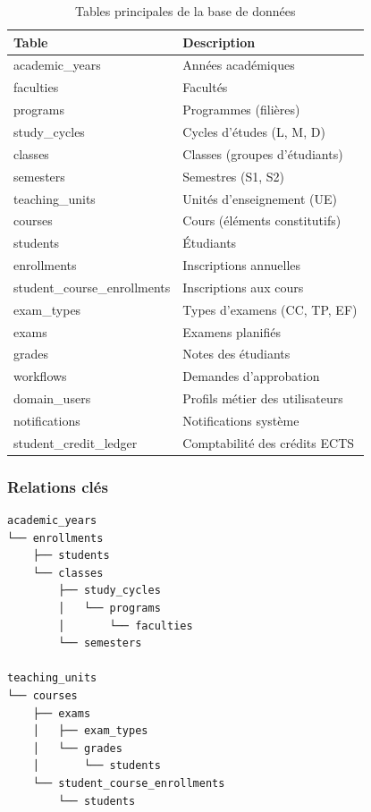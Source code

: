\begin{table}[h]
\centering
\footnotesize
\begin{tabular}{|l|p{8cm}|}
\hline
\textbf{Table} & \textbf{Description} \\
\hline
academic\_years & Années académiques \\
faculties & Facultés \\
programs & Programmes (filières) \\
study\_cycles & Cycles d'études (L, M, D) \\
classes & Classes (groupes d'étudiants) \\
semesters & Semestres (S1, S2) \\
teaching\_units & Unités d'enseignement (UE) \\
courses & Cours (éléments constitutifs) \\
students & Étudiants \\
enrollments & Inscriptions annuelles \\
student\_course\_enrollments & Inscriptions aux cours \\
exam\_types & Types d'examens (CC, TP, EF) \\
exams & Examens planifiés \\
grades & Notes des étudiants \\
workflows & Demandes d'approbation \\
domain\_users & Profils métier des utilisateurs \\
notifications & Notifications système \\
student\_credit\_ledger & Comptabilité des crédits ECTS \\
\hline
\end{tabular}
\caption{Tables principales de la base de données}
\end{table}

\subsubsection{Relations clés}

\begin{verbatim}
academic_years
└── enrollments
    ├── students
    └── classes
        ├── study_cycles
        │   └── programs
        │       └── faculties
        └── semesters

teaching_units
└── courses
    ├── exams
    │   ├── exam_types
    │   └── grades
    │       └── students
    └── student_course_enrollments
        └── students
\end{verbatim}

